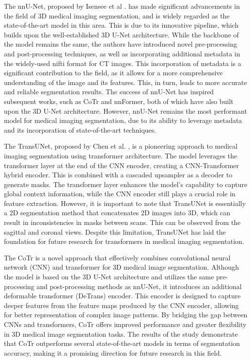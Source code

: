 \documentclass{article}
\begin{document}
The nnU-Net, proposed by Isensee et al \cite{14}. has made significant advancements in the field of 3D medical imaging segmentation, and is widely regarded as the state-of-the-art model in this area. This is due to its innovative pipeline, which builds upon the well-established 3D U-Net architecture. While the backbone of the model remains the same, the authors have introduced novel pre-processing and post-processing techniques, as well as incorporating additional metadata in the widely-used nifti format for CT images. This incorporation of metadata is a significant contribution to the field, as it allows for a more comprehensive understanding of the image and its features. This, in turn, leads to more accurate and reliable segmentation results. The success of nnU-Net has inspired subsequent works, such as CoTr and nnFormer, both of which have also built upon the 3D U-Net architecture. However, nnU-Net remains the most performant model for medical imaging segmentation, due to its ability to leverage metadata and its incorporation of state-of-the-art techniques.


The TransUNet, proposed by Chen et al. \cite{21}, is a pioneering approach to medical imaging segmentation using transformer architecture. The model leverages the transformer layer at the end of the CNN encoder, creating a CNN-Transformer hybrid encoder. This is combined with a cascaded upsampler as a decoder to generate masks. The transformer layer enhances the model's capability to capture global context information, while the CNN encoder still plays a crucial role in feature extraction. However, it is important to note that TransUNet is essentially a 2D segmentation method that concatenates 2D images into 3D, which can result in inconsistencies in masks between scans. This can be observed from the sagittal and coronal views. Despite this limitation, TransUNet has laid the foundation for future research for transformers in medical imaging segmentation.



The CoTr is a novel approach that effectively combines convolutional neural network (CNN) and transformer for 3D medical image segmentation. Although the model is based on the 3D U-Net architecture and utilizes the same pre-processing and post-processing methods as nnU-Net, it introduces an additional deformable transformer (DeTrans) encoder. This encoder is designed to capture deeper features from the feature maps produced by the CNN encoder, allowing for better representation of complex image patterns. By bridging the gap between CNNs and transformers, CoTr offers improved performance and greater flexibility in 3D medical image segmentation tasks. The results of the study demonstrate that CoTr outperforms several state-of-the-art models in terms of segmentation accuracy, making it a promising direction for future research in this field.
\end{document}
